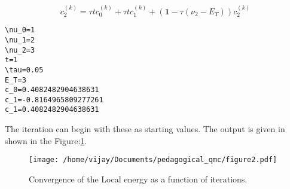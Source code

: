\documentclass[11pt]{article}
\begin{document}
\begin{equation}
\label{receqn5}
c^{(k)}_2 = \tau t c^{(k)}_0 + \tau t c^{(k)}_1 + \left(\mathbf{1}-\tau\left(\nu_2 - E_T\right)\right)c^{(k)}_2
\end{equation}

\begin{verbatim}
\nu_0=1
\nu_1=2
\nu_2=3
t=1
\tau=0.05
E_T=3
c_0=0.4082482904638631
c_1=-0.8164965809277261
c_1=0.4082482904638631
\end{verbatim}

The iteration can begin with these as starting values. The output is given in
shown in the Figure:\ref{figure2}.

\begin{figure}[htbp]
\centering
\texttt{[image: /home/vijay/Documents/pedagogical\_qmc/figure2.pdf]}
\caption{\label{figure2}Convergence of the Local energy as a function of iterations.}
\end{figure}
\end{document}
